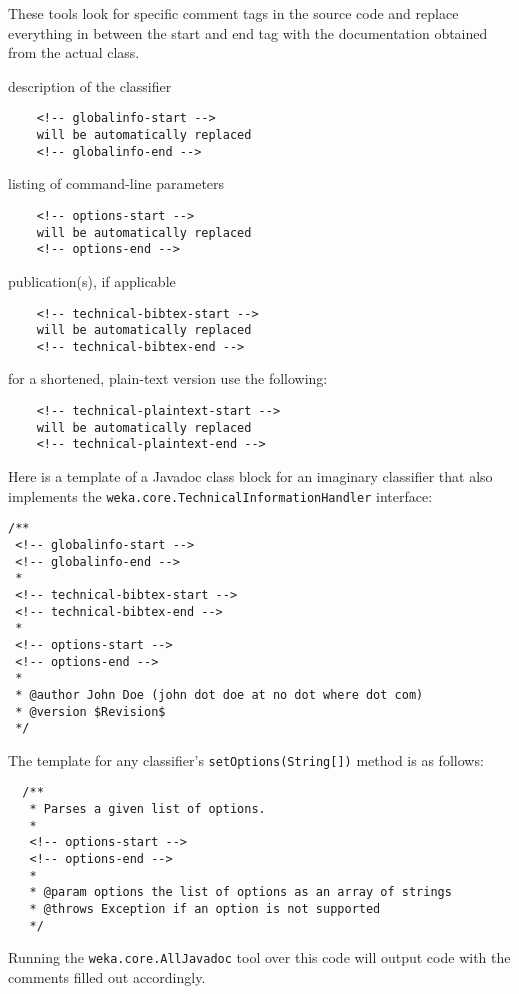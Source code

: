These tools look for specific comment tags in the source code and replace
everything in between the start and end tag with the documentation obtained
from the actual class.
\begin{tight_itemize}
  \item description of the classifier
    \begin{verbatim}
    <!-- globalinfo-start -->
    will be automatically replaced
    <!-- globalinfo-end -->
    \end{verbatim}
  \item listing of command-line parameters
    \begin{verbatim}
    <!-- options-start -->
    will be automatically replaced
    <!-- options-end -->
   \end{verbatim}
  \item publication(s), if applicable
    \begin{verbatim}
    <!-- technical-bibtex-start -->
    will be automatically replaced
    <!-- technical-bibtex-end -->
    \end{verbatim}
    for a shortened, plain-text version use the following:
    \begin{verbatim}
    <!-- technical-plaintext-start -->
    will be automatically replaced
    <!-- technical-plaintext-end -->
   \end{verbatim}
\end{tight_itemize}

\newpage
\noindent Here is a template of a Javadoc class block for an imaginary
classifier that also implements the
\texttt{weka.core.TechnicalInformationHandler} interface:
\begin{verbatim}
/**
 <!-- globalinfo-start -->
 <!-- globalinfo-end -->
 *
 <!-- technical-bibtex-start -->
 <!-- technical-bibtex-end -->
 *
 <!-- options-start -->
 <!-- options-end -->
 *
 * @author John Doe (john dot doe at no dot where dot com)
 * @version $Revision$
 */
\end{verbatim}
The template for any classifier's \texttt{setOptions(String[])} method
is as follows:
\begin{verbatim}
  /**
   * Parses a given list of options.
   *
   <!-- options-start -->
   <!-- options-end -->
   *
   * @param options the list of options as an array of strings
   * @throws Exception if an option is not supported
   */
\end{verbatim}
Running the \texttt{weka.core.AllJavadoc} tool over this code will output code
with the comments filled out accordingly.


